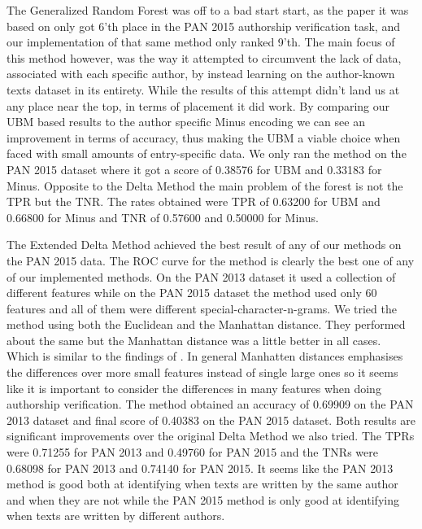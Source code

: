 The Generalized Random Forest was off to a bad start start, as the paper it
was based on \cite{pacheco2015} only got 6'th place in the PAN 2015 authorship
verification task, and our implementation of that same method only ranked 9'th.
The main focus of this method however, was the way it attempted to circumvent
the lack of data, associated with each specific author, by instead learning
on the author-known texts dataset in its entirety. While the results of this attempt
didn't land us at any place near the top, in terms of placement it did work. By
comparing our \gls{UBM} based results to the author specific Minus encoding we
can see an improvement in terms of accuracy, thus making the \gls{UBM} a viable
choice when faced with small amounts of entry-specific data. We only ran the
method on the PAN 2015 dataset where it got a score of 0.38576 for \gls{UBM} and
0.33183 for Minus. Opposite to the Delta Method the main problem of the forest
is not the \gls{TPR} but the \gls{TNR}. The rates obtained were \gls{TPR} of
0.63200 for \gls{UBM} and 0.66800 for Minus and \gls{TNR} of 0.57600 and 0.50000
for Minus. %

The Extended Delta Method achieved the best result of any of our methods on
the PAN 2015 data. The ROC curve for the method is clearly the best one of
any of our implemented methods. On the PAN 2013 dataset it used a collection
of different features while on the PAN 2015 dataset the method used only 60
features and all of them were different special-character-n-grams. We tried the
method using both the Euclidean and the Manhattan distance. They performed about
the same but the Manhattan distance was a little better in all cases. Which
is similar to the findings of \cite{evert2015towards}. In general Manhatten
distances emphasises the differences over more small features instead of single
large ones so it seems like it is important to consider the differences in many
features when doing authorship verification. The method obtained an accuracy
of 0.69909 on the PAN 2013 dataset and final score of 0.40383 on the PAN 2015
dataset. Both results are significant improvements over the original Delta
Method we also tried. The \gls{TPR}s were 0.71255 for PAN 2013 and 0.49760 for
PAN 2015 and the \gls{TNR}s were 0.68098 for PAN 2013 and 0.74140 for PAN 2015.
It seems like the PAN 2013 method is good both at identifying when texts are
written by the same author and when they are not while the PAN 2015 method is
only good at identifying when texts are written by different authors.

